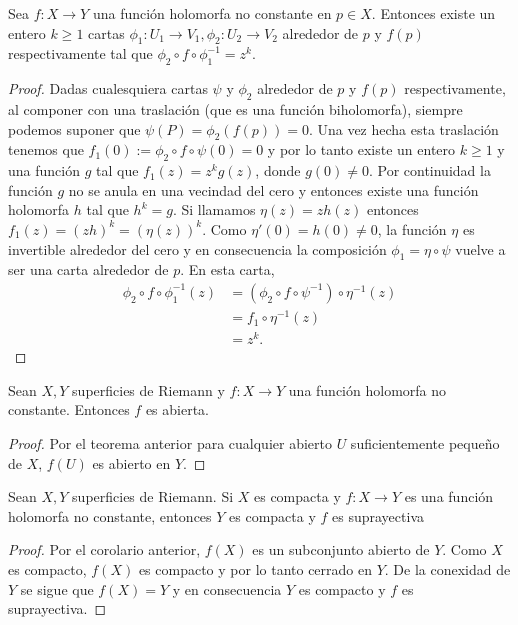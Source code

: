 \begin{Teorema}
\label{Teo:FormaNormalLocal}
Sea $f\colon X\rightarrow Y$ una función holomorfa no constante en $p\in X$. Entonces existe un entero $k\geq 1$ cartas $\phi_{1}\colon U_{1}\rightarrow V_{1}, \phi_{2}\colon U_{2}\rightarrow V_{2}$ alrededor de $p$ y $f(p)$ respectivamente tal que $\phi_{2}\circ f \circ\phi^{-1}_{1}=z^{k}$.
\end{Teorema}
\begin{proof}
Dadas cualesquiera cartas $\psi$ y $\phi_{2}$ alrededor de $p$ y $f(p)$ respectivamente, al componer con una traslación (que es una función biholomorfa), siempre podemos suponer que $\psi(P)=\phi_{2}(f(p))=0$. Una vez hecha esta traslación tenemos que $f_{1}(0):=\phi_{2}\circ f \circ\psi(0)=0$ y por lo tanto existe un entero $k\geq 1$ y una función $g$ tal que $f_{1}(z)=z^{k}g(z)$, donde $g(0)\neq 0$. Por continuidad la función $g$ no se anula en una vecindad del cero y entonces existe una función holomorfa $h$ tal que $h^{k}=g$. Si llamamos $\eta(z)=zh(z)$ entonces $f_{1}(z)=(zh)^{k}=(\eta(z))^{k}$. Como $\eta'(0)=h(0)\neq 0$, la función $\eta$ es invertible alrededor del cero y en consecuencia la composición $\phi_{1}=\eta\circ\psi$ vuelve a ser una carta alrededor de $p$. En esta carta,
\begin{align*}
\phi_{2}\circ f\circ\phi_{1}^{-1}(z) &= (\phi_{2}\circ f\circ\psi^{-1})\circ\eta^{-1}(z)\\
\, &= f_{1}\circ\eta^{-1}(z)\\
\, &= z^{k}.
\end{align*}
\end{proof}

\begin{Corolario}
\label{Coro:FuncionAbierta}
Sean $X,Y$ superficies de Riemann y $f\colon X\rightarrow Y$ una función holomorfa no constante. Entonces $f$ es abierta.
\end{Corolario}
\begin{proof}
Por el teorema anterior para cualquier abierto  $U$ suficientemente pequeño de $X$, $f(U)$ es abierto en $Y$. 
\end{proof}

\begin{Teorema}
Sean $X,Y$ superficies de Riemann. Si $X$ es compacta y $f\colon X\rightarrow Y$ es una función holomorfa no constante, entonces $Y$ es compacta y $f$ es suprayectiva
\end{Teorema}
\begin{proof}
Por el corolario anterior, $f(X)$ es un subconjunto abierto de $Y$. Como $X$ es compacto, $f(X)$ es compacto y por lo tanto cerrado en $Y$. De la conexidad de $Y$ se sigue que $f(X)=Y$ y en consecuencia $Y$ es compacto y $f$ es suprayectiva.
\end{proof}

